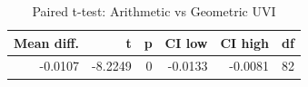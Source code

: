 \begin{table}

\caption{Paired t-test: Arithmetic vs Geometric UVI }
\centering
\begin{tabular}[t]{rrrrrr}
\toprule
Mean diff. & t & p & CI low & CI high & df\\
\midrule
-0.0107 & -8.2249 & 0 & -0.0133 & -0.0081 & 82\\
\bottomrule
\end{tabular}
\end{table}
